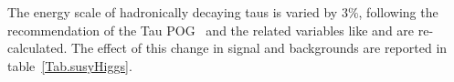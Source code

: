 The energy scale of hadronically decaying taus is varied by $3\%$, following the recommendation of the Tau POG~\cite{TauPOG} and the related variables like \MET and \mttwo are re-calculated. The effect of this change in signal and backgrounds are reported in table~\ref{Tab.susyHiggs}.








